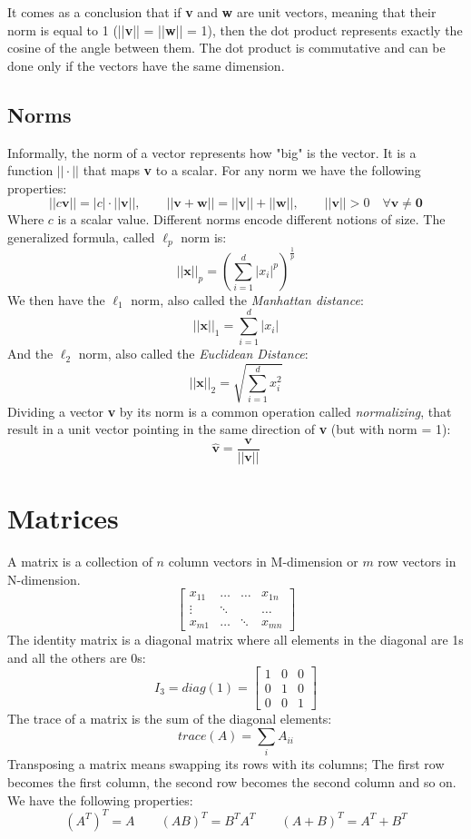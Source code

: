 \documentclass[
	11pt, %
	fleqn, %
	a4paper, %
]{LegrandOrangeBook}
\begin{document}
It comes as a conclusion that if \textbf{v} and \textbf{w} are unit vectors, meaning that their norm is equal to 1 (||\textbf{v}|| = ||\textbf{w}|| = 1), then the dot product represents exactly the cosine of the angle between them. The dot product is commutative and can be done only if the vectors have the same dimension.

\subsection{Norms}
Informally, the norm of a vector represents how "big" is the vector. It is a function $||\cdot||$ that maps \textbf{v} to a scalar. For any norm we have the following properties:
$$||c\textbf{v}|| = |c| \cdot ||\textbf{v}||, \qquad ||\textbf{v} + \textbf{w}|| = ||\textbf{v}|| + || \textbf{w}||, \qquad ||\textbf{v}|| > 0 \quad \forall \textbf{v} \neq \textbf{0}$$
Where $c$ is a scalar value. Different norms encode different notions of size. The generalized formula, called $\ell_p$ norm is:
$$||\textbf{x}||_p = (\sum_{i = 1}^{d}|x_i|^p)^{\frac{1}{p}}$$
We then have the $\ell_1$ norm, also called the \emph{Manhattan distance}:
$$ ||\textbf{x}||_1 = \sum_{i=1}^{d}|x_i|$$
And the $\ell_2$ norm, also called the \emph{Euclidean Distance}:
$$ ||\textbf{x}||_2 = \sqrt{\sum_{i=1}^{d}x_i^2}$$
Dividing a vector \textbf{v} by its norm is a common operation called \emph{normalizing}, that result in a unit vector pointing in the same direction of \textbf{v} (but with norm = 1):
$$\hat{\textbf{v}} = \frac{\textbf{v}}{||\textbf{v}||}$$

\section{Matrices}
A matrix is a collection of $n$ column vectors in M-dimension or $m$ row vectors in N-dimension.
$$
	\begin{bmatrix}
		x_{11} & \hdots & \hdots & x_{1n} \\
		\vdots & \ddots &        & \hdots \\
		x_{m1} & \hdots & \ddots & x_{mn}
	\end{bmatrix}
$$
The identity matrix is a diagonal matrix where all elements in the diagonal are 1s and all the others are 0s:
$$ I_3 = diag(1) =
	\begin{bmatrix}
		1 & 0 & 0 \\
		0 & 1 & 0 \\
		0 & 0 & 1
	\end{bmatrix}
$$
The trace of a matrix is the sum of the diagonal elements:
$$trace(A) = \sum_{i}A_{ii}$$
Transposing a matrix means swapping its rows with its columns; The first row becomes the first column, the second row becomes the second column and so on. We have the following properties:
$$(A^T)^T = A \qquad (AB)^T = B^T A^T \qquad (A + B)^T = A^T + B^T$$
\end{document}
